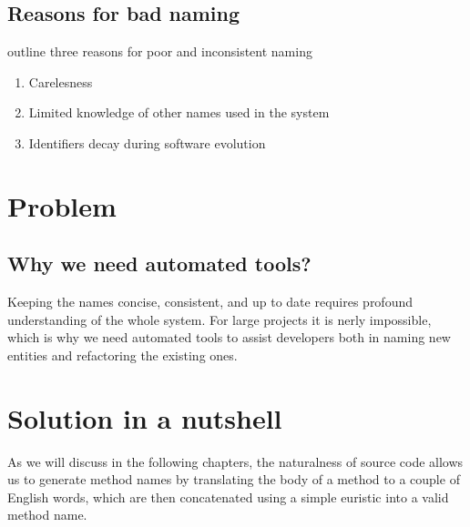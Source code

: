 \subsection{Reasons for bad naming}

\cite{Deis06} outline three reasons for poor and inconsistent naming

\begin{enumerate}
	\item Carelesness
	\item Limited knowledge of other names used in the system
	\item Identifiers decay during software evolution
\end{enumerate}

\section{Problem}

\subsection{Why we need automated tools?}

Keeping the names concise, consistent, and up to date requires profound understanding of the whole system. For large projects it is nerly impossible, which is why we need automated tools to assist developers both in naming new entities and refactoring the  existing ones.

\section{Solution in a nutshell}

As we will discuss in the following chapters, the naturalness of source code allows us to generate method names by translating the body of a method to a couple of English words, which are then concatenated using a simple euristic into a valid method name.
